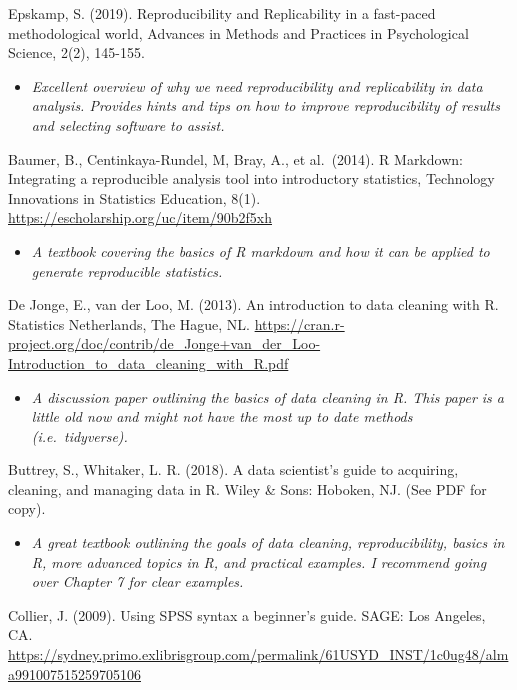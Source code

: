 \documentclass[
]{book}
\providecommand{\tightlist}{%
  \setlength{\itemsep}{0pt}\setlength{\parskip}{0pt}}
\begin{document}
Epskamp, S. (2019). Reproducibility and Replicability in a fast-paced methodological world, Advances in Methods and Practices in Psychological Science, 2(2), 145-155.

\begin{itemize}
\tightlist
\item
  \emph{Excellent overview of why we need reproducibility and replicability in data analysis. Provides hints and tips on how to improve reproducibility of results and selecting software to assist.}
\end{itemize}

Baumer, B., Centinkaya-Rundel, M, Bray, A., et al.~(2014). R Markdown: Integrating a reproducible analysis tool into introductory statistics, Technology Innovations in Statistics Education, 8(1). \url{https://escholarship.org/uc/item/90b2f5xh}

\begin{itemize}
\tightlist
\item
  \emph{A textbook covering the basics of R markdown and how it can be applied to generate reproducible statistics.}
\end{itemize}

De Jonge, E., van der Loo, M. (2013). An introduction to data cleaning with R. Statistics Netherlands, The Hague, NL. \url{https://cran.r-project.org/doc/contrib/de_Jonge+van_der_Loo-Introduction_to_data_cleaning_with_R.pdf}

\begin{itemize}
\tightlist
\item
  \emph{A discussion paper outlining the basics of data cleaning in R. This paper is a little old now and might not have the most up to date methods (i.e.~tidyverse).}
\end{itemize}

Buttrey, S., Whitaker, L. R. (2018). A data scientist's guide to acquiring, cleaning, and managing data in R. Wiley \& Sons: Hoboken, NJ. (See PDF for copy).

\begin{itemize}
\tightlist
\item
  \emph{A great textbook outlining the goals of data cleaning, reproducibility, basics in R, more advanced topics in R, and practical examples. I recommend going over Chapter 7 for clear examples.}
\end{itemize}

Collier, J. (2009). Using SPSS syntax a beginner's guide. SAGE: Los Angeles, CA. \url{https://sydney.primo.exlibrisgroup.com/permalink/61USYD_INST/1c0ug48/alma991007515259705106}
\end{document}
